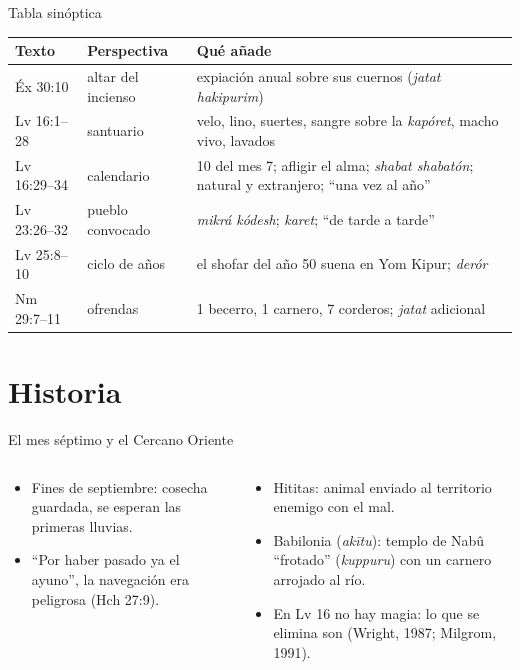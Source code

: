 \begin{frame}{Tabla sinóptica}
\scriptsize\renewcommand{\arraystretch}{1.2}
\begin{tabular}{@{}L{1.7cm}L{3.0cm}L{6.8cm}@{}}
\toprule
\textbf{Texto} & \textbf{Perspectiva} & \textbf{Qué añade} \\ \midrule
Éx 30:10 & altar del incienso & expiación anual sobre sus cuernos (\emph{jatat hakipurim}) \\
Lv 16:1--28 & santuario & velo, lino, suertes, sangre sobre la \emph{kapóret}, macho vivo, lavados \\
Lv 16:29--34 & calendario & 10 del mes 7; afligir el alma; \emph{shabat shabatón}; natural y extranjero; ``una vez al año'' \\
Lv 23:26--32 & pueblo convocado & \emph{mikrá kódesh}; \emph{karet}; ``de tarde a tarde'' \\
Lv 25:8--10 & ciclo de años & el shofar del año 50 suena en Yom Kipur; \emph{derór} \\
Nm 29:7--11 & ofrendas & 1 becerro, 1 carnero, 7 corderos; \emph{jatat} adicional \\
\bottomrule
\end{tabular}\par\medskip
{}
\end{frame}

\section{Historia}

\begin{frame}{El mes séptimo y el Cercano Oriente}
\begin{columns}[t,onlytextwidth]
\begin{column}{0.49\textwidth}\small
{}
\begin{itemize}
\item Fines de septiembre: cosecha guardada, se esperan las primeras lluvias.
\item ``Por haber pasado ya el ayuno'', la navegación era peligrosa (Hch 27:9).
\end{itemize}
\end{column}
\begin{column}{0.49\textwidth}\small
{}
\begin{itemize}
\item Hititas: animal enviado al territorio enemigo con el mal.
\item Babilonia (\emph{akītu}): templo de Nabû ``frotado'' (\emph{kuppuru}) con un carnero arrojado al río.
\item En Lv 16 no hay magia: lo que se elimina son  (Wright, 1987; Milgrom, 1991).
\end{itemize}
\end{column}
\end{columns}
\end{frame}

